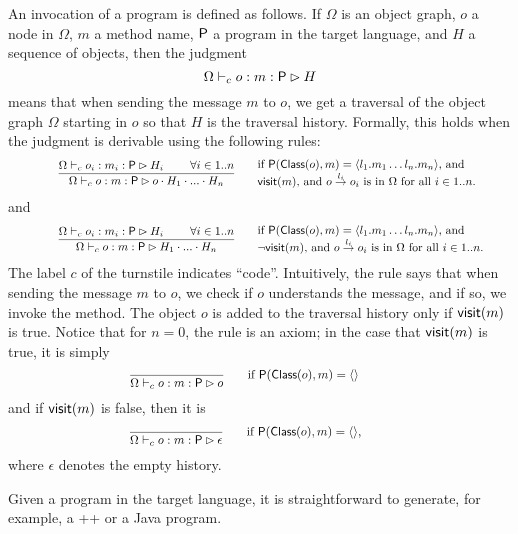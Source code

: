 An invocation of a program is defined as follows.  If $\Omega$ is an
object graph, $o$ a node in $\Omega$, $m$ a method name, $\mbox{\sf P}$ a
program in the target language, and $H$ a sequence of objects, then
the judgment
\[
\Omega \vdash_c o:m:\mbox{\sf P} \rhd H
\]
means that when sending the message $m$ to $o$, we get a traversal of
the object graph $\Omega$ starting in $o$ so that $H$ is the traversal
history.  Formally, this holds when the judgment is derivable using
the following rules:
\[
\hspace*{1.5cm}
\irule{\Omega \vdash_c o_i:m_i: \Prog \rhd H_i \air \forall i \in 1..n}
      {\Omega \vdash_c o:m: \Prog \rhd o \cdot H_1  \cdot ... \cdot H_n} 
   ~~~~~~
      \parbox{3in}{
       if $\Prog(\Class(o),m) = \interval{l_1.m_1\ldots l_n.m_n}$, and \\
          $\Visit(m)$,
         and $\edge o {l_i} {o_i} \mbox{ is in } \Omega
                \mbox{ for all }     i \in 1..n$.}
\]
and 
\[
\hspace*{1.5cm}
\irule{\Omega \vdash_c o_i:m_i: \Prog \rhd H_i \air \forall i \in 1..n}
      {\Omega \vdash_c o:m: \Prog \rhd  H_1  \cdot ... \cdot H_n} 
   ~~~~~~
      \parbox{3in}{
       if $\Prog(\Class(o),m) = \interval{l_1.m_1\ldots l_n.m_n}$, and \\
          $\neg\Visit(m)$, and $\edge o {l_i} {o_i} \mbox{ is in } \Omega 
                  \mbox{ for all } i \in 1..n$.}
\]
The label $c$ of the turnstile indicates ``code''.  Intuitively, the
rule says that when sending the message $m$ to $o$, we check if $o$
understands the message, and if so, we invoke the method. The object
$o$ is added to the traversal history only if $\mbox{\sf visit}(m)$ is true.
Notice that for $n=0$, the rule is an axiom; in the case that
$\mbox{\sf visit}(m)$ is true, it is simply
\[
\hspace*{3.5cm} 
\irule{}
      {\Omega \vdash_c o:m: \Prog \rhd o }
   ~~~~~~
      \parbox{3in}{
       if $\Prog(\Class(o),m) = \interval{}$}
\]
and if $\mbox{\sf visit}(m)$ is false, then it is
\[
\hspace*{3.5cm}
\irule{}
      {\Omega \vdash_c o:m: \Prog \rhd \epsilon }
   ~~~~~~
      \parbox{3in}{
       if $\Prog(\Class(o),m) = \interval{}$,}
\]
where $\epsilon$ denotes the empty history.

Given a program in the target language, it is straightforward to
generate, for example, a \C++ or a Java program.


